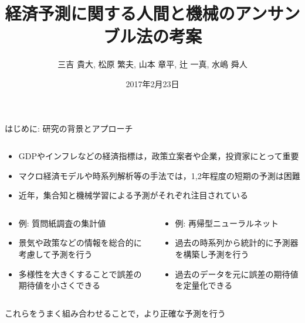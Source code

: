 \documentclass[dvipdfmx]{beamer}
\title{経済予測に関する人間と機械のアンサンブル法の考案}
\author{三吉 貴大, 松原 繁夫, 山本 章平, 辻 一真, 水嶋 舜人}
\institute{情報学研究科 社会情報学専攻 石田・松原研究室}
\date{2017年2月23日}
\begin{document}
\begin{frame}{}
  \begin{block}{はじめに: 研究の背景とアプローチ}
    \begin{columns}
      \begin{column}{.59\textwidth}
        \begin{itemize}
          \item GDPやインフレなどの経済指標は，政策立案者や企業，投資家にとって重要
          \item マクロ経済モデルや時系列解析等の手法では，1,2年程度の短期の予測は困難
          \item 近年，集合知と機械学習による予測がそれぞれ注目されている
        \end{itemize}
        \smallskip
        \begin{columns}
          \begin{column}{.49\textwidth}
            \begin{itembox}[l]{}
              \begin{itemize}
                \item 例: 質問紙調査の集計値
                \item 景気や政策などの情報を総合的に考慮して予測を行う
                \item 多様性を大きくすることで誤差の期待値を小さくできる
              \end{itemize}
            \end{itembox}
          \end{column}
          \begin{column}{.49\textwidth}
            \begin{itembox}[l]{}
              \begin{itemize}
                \item 例: 再帰型ニューラルネット
                \item 過去の時系列から統計的に予測器を構築し予測を行う
                \item 過去のデータを元に誤差の期待値を定量化できる
              \end{itemize}
            \end{itembox}
          \end{column}
        \end{columns}
        \smallskip
        \begin{center}
          \alert{これらをうまく組み合わせることで，より正確な予測を行う}
        \end{center}


\end{column}
\end{columns}
\end{block}
\end{frame}
\end{document}

